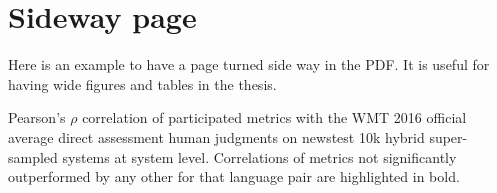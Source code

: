 \section{Sideway page}
Here is an example to have a page turned side way in the PDF. It is useful for having wide figures and tables in the thesis. 

\begin{landscape} 
\begin{table}
\caption{Pearson's
        $\rho $        correlation of participated metrics with the WMT 2016 official average
        direct assessment human judgments on newstest 10k hybrid super-sampled
        systems at system level. Correlations of metrics not significantly
        outperformed by any other for that language pair are highlighted in
        bold.}
\centering


\end{table}
\end{landscape}
